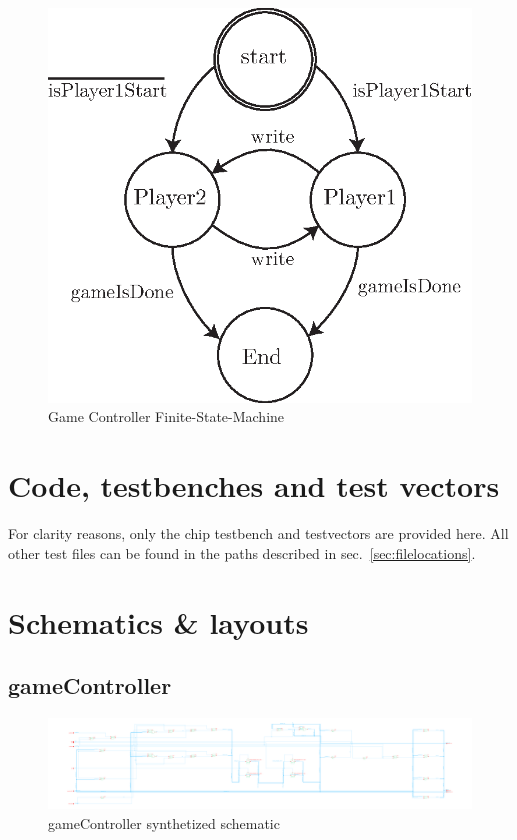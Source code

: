 \documentclass[]{article}
\begin{document}
\begin{figure}
\centering
\includegraphics[width=.3\textwidth]{gameController-FSM}
\caption{Game Controller Finite-State-Machine}
\label{fig:gameController-FSM}
\end{figure}


\section{Code, testbenches and test vectors}
For clarity reasons, only the chip testbench and testvectors are provided here. All other test files can be found in the paths described in sec.~\ref{sec:filelocations}.









\section{Schematics \& layouts}

\subsection{gameController}
\begin{figure}[H]
\centering
\includegraphics[width=.9\textwidth]{gameController-schematic}
\caption{gameController synthetized schematic}
\label{fig:gameController-schematic}
\end{figure}
\end{document}
